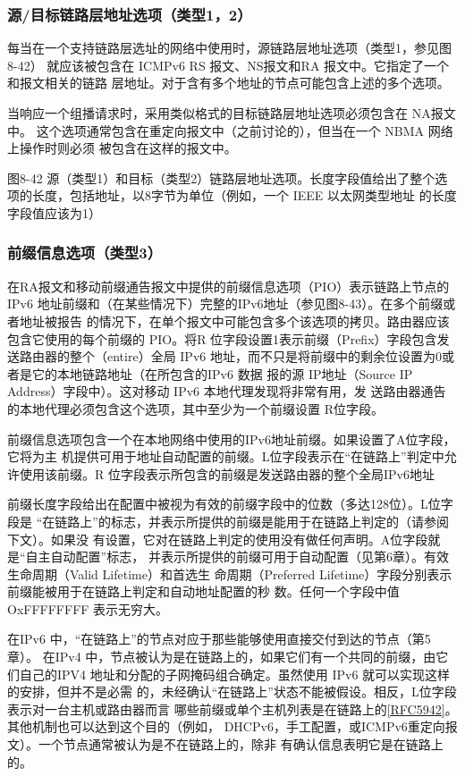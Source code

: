 \subsubsection{源/目标链路层地址选项（类型1，2）}

每当在一个支持链路层选址的网络中使用时，源链路层地址选项（类型1，参见图8-42）
就应该被包含在 ICMPv6 RS 报文、NS报文和RA 报文中。它指定了一个和报文相关的链路
层地址。对于含有多个地址的节点可能包含上述的多个选项。

当响应一个组播请求时，采用类似格式的目标链路层地址选项必须包含在 NA报文中。
这个选项通常包含在重定向报文中（之前讨论的），但当在一个 NBMA 网络上操作时则必须
被包含在这样的报文中。

图8-42 源（类型1）和目标（类型2）链路层地址选项。长度字段值给出了整个选
项的长度，包括地址，以8字节为单位（例如，一个 IEEE 以太网类型地址
的长度字段值应该为1）

\subsubsection{前缀信息选项（类型3）}
在RA报文和移动前缀通告报文中提供的前缀信息选项（PIO）表示链路上节点的IPv6
地址前缀和（在某些情况下）完整的IPv6地址（参见图8-43）。在多个前缀或者地址被报告
的情况下，在单个报文中可能包含多个该选项的拷贝。路由器应该包含它使用的每个前缀的
PIO。将R 位字段设置1表示前缀（Prefix）字段包含发送路由器的整个（entire）全局 IPv6
地址，而不只是将前缀中的剩余位设置为0或者是它的本地链路地址（在所包含的IPv6 数据
报的源 IP地址（Source IP Address）字段中）。这对移动 IPv6 本地代理发现将非常有用，发
送路由器通告的本地代理必须包含这个选项，其中至少为一个前缀设置 R位字段。

前缀信息选项包含一个在本地网络中使用的IPv6地址前缀。如果设置了A位字段，它将为主
机提供可用于地址自动配置的前缀。L位字段表示在“在链路上”判定中允许使用该前缀。R
位字段表示所包含的前缀是发送路由器的整个全局IPv6地址

前缀长度字段给出在配置中被视为有效的前缀字段中的位数（多达128位）。L位字段是
“在链路上”的标志，并表示所提供的前缀是能用于在链路上判定的（请参阅下文）。如果没
有设置，它对在链路上判定的使用没有做任何声明。A位字段就是“自主自动配置”标志，
并表示所提供的前缀可用于自动配置（见第6章）。有效生命周期（Valid Lifetime）和首选生
命周期（Preferred Lifetime）字段分别表示前缀能被用于在链路上判定和自动地址配置的秒
数。任何一个字段中值 OxFFFFFFFF 表示无穷大。

在IPv6 中，“在链路上”的节点对应于那些能够使用直接交付到达的节点（第5章）。
在IPv4 中，节点被认为是在链路上的，如果它们有一个共同的前缀，由它们自己的IPV4
地址和分配的子网掩码组合确定。虽然使用 IPv6 就可以实现这样的安排，但并不是必需
的，未经确认“在链路上”状态不能被假设。相反，L位字段表示对一台主机或路由器而言
哪些前缀或单个主机列表是在链路上的\href{https://www.rfc-editor.org/rfc/rfc5942}{[RFC5942]}。其他机制也可以达到这个目的（例如，
DHCPv6，手工配置，或ICMPv6重定向报文）。一个节点通常被认为是不在链路上的，除非
有确认信息表明它是在链路上的。

